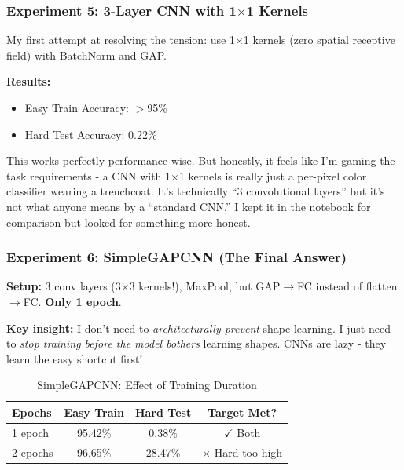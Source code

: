 \documentclass[9pt,a4paper,twocolumn,twoside]{tau-class/tau}
\begin{document}
        \subsubsection{Experiment 5: 3-Layer CNN with 1$\times$1 Kernels}

        My first attempt at resolving the tension: use 1$\times$1 kernels (zero spatial receptive field) with BatchNorm and GAP.

        \textbf{Results:}
        \begin{itemize}
            \item Easy Train Accuracy: $>$95\%
            \item Hard Test Accuracy: 0.22\%
        \end{itemize}

        This works perfectly performance-wise. But honestly, it feels like I'm gaming the task requirements - a CNN with 1$\times$1 kernels is really just a per-pixel color classifier wearing a trenchcoat. It's technically ``3 convolutional layers'' but it's not what anyone means by a ``standard CNN.'' I kept it in the notebook for comparison but looked for something more honest.

        \subsubsection{Experiment 6: SimpleGAPCNN (The Final Answer)}

        \textbf{Setup:} 3 conv layers (3$\times$3 kernels!), MaxPool, but GAP$\rightarrow$FC instead of flatten$\rightarrow$FC. \textbf{Only 1 epoch}.

        \textbf{Key insight:} I don't need to \textit{architecturally prevent} shape learning. I just need to \textit{stop training before the model bothers} learning shapes. CNNs are lazy - they learn the easy shortcut first!

        \begin{table}[H]
            \caption{SimpleGAPCNN: Effect of Training Duration}
            \label{tab:day3_gapcnn}
            \begin{tabular}{lccc}
            \toprule
            \textbf{Epochs} & \textbf{Easy Train} & \textbf{Hard Test} & \textbf{Target Met?} \\
            \midrule
            1 epoch & 95.42\% & 0.38\% & \textcolor{green!60!black}{$\checkmark$ Both} \\
            2 epochs & 96.65\% & 28.47\% & \textcolor{red!60!black}{$\times$ Hard too high} \\
            \bottomrule
            \end{tabular}
        \end{table}
\end{document}
